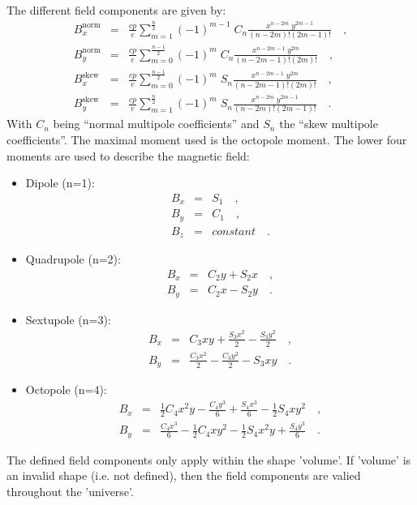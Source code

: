 The different field components are given by:  
\begin{eqnarray*}
B_{x}^{\mathrm{norm}} &=& \frac{cp}{e} \sum_{m=1}^{\frac{n}{2}} (-1)^{m-1} \; C_n \frac{ x^{n-2 m} \; y^{2 m-1} }{ (n-2 m)!(2 m-1)! } \quad, \\
B_{y}^{\mathrm{norm}} &=& \frac{cp}{e} \sum_{m=0}^{\frac{n-1}{2}} (-1)^m \; C_n \frac{ x^{n-2 m-1} \; y^{2 m} }{ (n-2 m-1)! (2 m)! } \quad, \\
B_{x}^{\mathrm{skew}} &=& \frac{cp}{e} \sum_{m=0}^{\frac{n-1}{2}} (-1)^m \; S_n \frac{ x^{n-2 m-1} \; y^{2 m} }{ (n-2 m-1)! (2 m)! } \quad, \\
B_{y}^{\mathrm{skew}} &=& \frac{cp}{e} \sum_{m=1}^{\frac{n}{2}} (-1)^m \; S_n \frac{ x^{n-2 m} \; y^{2 m-1} }{ (n-2 m)! (2 m-1)! }\quad.
\end{eqnarray*}
With $C_n$ being ``normal multipole coefficients'' and $S_n$ the ``skew multipole coefficients''. The maximal moment used is the octopole moment. The lower four moments are used
to describe the magnetic field:
\begin{itemize}
\item Dipole (n=1):
    \begin{eqnarray*}
        B_x &=& S_1\quad, \\
        B_y &=& C_1\quad, \\
        B_z &=& constant\quad.
    \end{eqnarray*}
\item Quadrupole (n=2):
    \begin{eqnarray*}
        B_x &=& C_2 y+S_2 x\quad, \\
        B_y &=& C_2 x-S_2 y\quad.
    \end{eqnarray*}
\item Sextupole (n=3):
    \begin{eqnarray*}
        B_x         &=& C_3 x y+\frac{S_3 x^2}{2}-\frac{S_3 y^2}{2}\quad, \\
        B_y         &=& \frac{C_3 x^2}{2}-\frac{C_3 y^2}{2}-S_3 x y\quad.
    \end{eqnarray*}

\item Octopole (n=4):
    \begin{eqnarray*}
        B_x &=& \frac{1}{2} C_4 x^2 y-\frac{C_4 y^3}{6}+\frac{S_4 x^3}{6}-\frac{1}{2} S_4 x y^2\quad,\\
        B_y &=& \frac{C_4 x^3}{6}-\frac{1}{2} C_4 x y^2-\frac{1}{2} S_4 x^2 y+\frac{S_4 y^3}{6}\quad.
    \end{eqnarray*}
\end{itemize}
The defined field components only apply within the shape 'volume'. If 'volume' is an invalid shape (i.e. not defined), then the field components are valied throughout the 'universe'.

